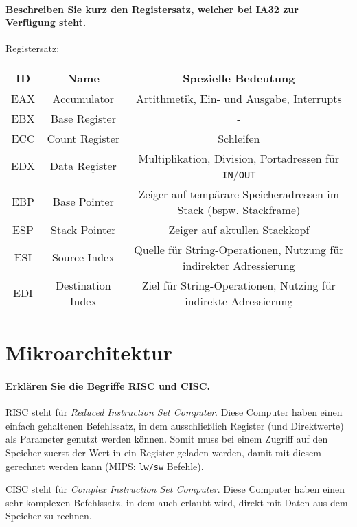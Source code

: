 	\paragraph{Beschreiben Sie kurz den Registersatz, welcher bei IA32 zur Verfügung steht.}
		Registersatz: \\
		\begin{tabular}{c | c | c}
			ID  & Name              & Spezielle Bedeutung                                                 \\
			\hline
			EAX & Accumulator       & Artithmetik, Ein- und Ausgabe, Interrupts                           \\
			EBX & Base Register     & -                                                                   \\
			ECC & Count Register    & Schleifen                                                           \\
			EDX & Data Register     & Multiplikation, Division, Portadressen für \texttt{IN}/\texttt{OUT} \\
			EBP & Base Pointer      & Zeiger auf tempärare Speicheradressen im Stack (bspw. Stackframe)   \\
			ESP & Stack Pointer     & Zeiger auf aktullen Stackkopf                                       \\
			ESI & Source Index      & Quelle für String-Operationen, Nutzung für indirekter Adressierung  \\
			EDI & Destination Index & Ziel für String-Operationen, Nutzing für indirekte Adressierung     \\
		\end{tabular}

\section{Mikroarchitektur}
\paragraph{Erklären Sie die Begriffe RISC und CISC.}
RISC steht für \textit{Reduced Instruction Set Computer}. Diese Computer haben einen einfach gehaltenen Befehlssatz, in dem ausschließlich Register (und Direktwerte) als Parameter genutzt werden können. Somit muss bei einem Zugriff auf den Speicher zuerst der Wert in ein Register geladen werden, damit mit diesem gerechnet werden kann (MIPS: \texttt{lw/sw} Befehle).

CISC steht für \textit{Complex Instruction Set Computer}. Diese Computer haben einen sehr komplexen Befehlssatz, in dem auch erlaubt wird, direkt mit Daten aus dem Speicher zu rechnen.

